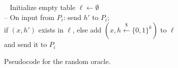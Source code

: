 \begin{bbox}[title={Functionality $\F_{\m{RO}}$}]
~
Initialize empty table $\ell \leftarrow \emptyset$\\
\qquad -- On input  from $P_i$: send $h'$ to $P_i$;\\
\qquad if $(x,h')$ exists in $\ell$, else add $(x, h \xleftarrow{\$}\{0,1\}^k)$ to $\ell$\\
\qquad and send it to $P_i$

\end{bbox}
\vspace{-0.5em}
\caption{Pseudocode for the random oracle.}
\label{fig:fro}
